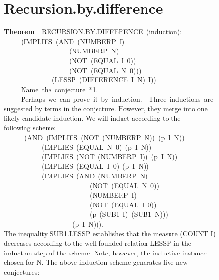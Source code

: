 \documentclass[10pt]{book}
\newenvironment{pubasis}{\begin{flushleft}}{\end{flushleft}}
\newcommand{\axiomordefinition}[1]{\vspace{6pt}\Large\textsf{\textbf{#1}}\normalsize}
\begin{document}
\section{Recursion.by.difference}
\begin{pubasis}
\axiomordefinition{Theorem}~~RECURSION.BY.DIFFERENCE~(induction):\\
~~~~~(IMPLIES~(AND~(NUMBERP~I)\\
~~~~~~~~~~~~~~~~~~~(NUMBERP~N)\\
~~~~~~~~~~~~~~~~~~~(NOT~(EQUAL~I~0))\\
~~~~~~~~~~~~~~~~~~~(NOT~(EQUAL~N~0)))\\
~~~~~~~~~~~~~~(LESSP~(DIFFERENCE~I~N)~I))\\

~~~~~Name~the~conjecture~*1.\\

~~~~~Perhaps~we~can~prove~it~by~induction.~~Three~inductions~are\\
suggested by terms in the conjecture.  However, they merge into one\\
likely candidate induction.  We will induct according to the\\
following scheme:\\
~~~~~~(AND~(IMPLIES~(NOT~(NUMBERP~N))~(p~I~N))\\
~~~~~~~~~~~(IMPLIES~(EQUAL~N~0)~(p~I~N))\\
~~~~~~~~~~~(IMPLIES~(NOT~(NUMBERP~I))~(p~I~N))\\
~~~~~~~~~~~(IMPLIES~(EQUAL~I~0)~(p~I~N))\\
~~~~~~~~~~~(IMPLIES~(AND~(NUMBERP~N)\\
~~~~~~~~~~~~~~~~~~~~~~~~~(NOT~(EQUAL~N~0))\\
~~~~~~~~~~~~~~~~~~~~~~~~~(NUMBERP~I)\\
~~~~~~~~~~~~~~~~~~~~~~~~~(NOT~(EQUAL~I~0))\\
~~~~~~~~~~~~~~~~~~~~~~~~~(p~(SUB1~I)~(SUB1~N)))\\
~~~~~~~~~~~~~~~~~~~~(p~I~N))).\\
The inequality SUB1.LESSP establishes that the measure (COUNT I)\\
decreases according to the well-founded relation LESSP in the\\
induction step of the scheme.  Note, however, the inductive instance\\
chosen for N.  The above induction scheme generates five new\\
conjectures:\\


\end{pubasis}
\end{document}
